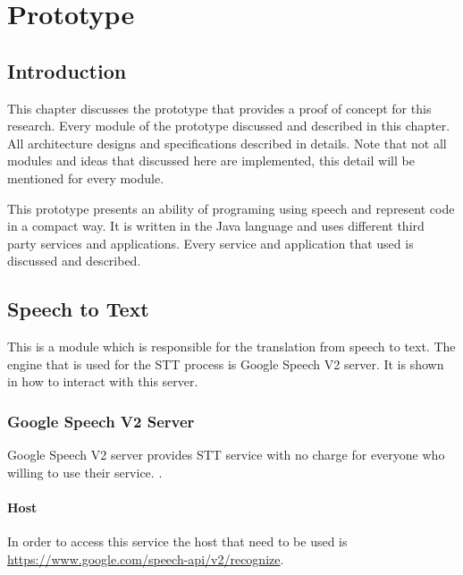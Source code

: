 \chapter{Prototype}
\section{Introduction}
This chapter discusses the prototype that provides a proof of concept for this research. Every module of the prototype discussed and described in this chapter. All architecture designs and specifications described in details. Note that not all modules and ideas that discussed here are implemented, this detail will be mentioned for every module.

This prototype presents an ability of programing using speech and represent code in a compact way. It is written in the Java language and uses different third party services and applications. Every service and application that used is discussed and described.

\section{Speech to Text}
This is a module which is responsible for the translation from speech to text. The engine that is used for the STT process is Google Speech V2 server. It is shown in \citet{google15} how to interact with this server.
\subsection{Google Speech V2 Server}
Google Speech V2 server provides STT service with no charge for everyone who willing to use their service.
.
\subsubsection{Host}
In order to access this service the host that need to be used is \url{https://www.google.com/speech-api/v2/recognize}.
